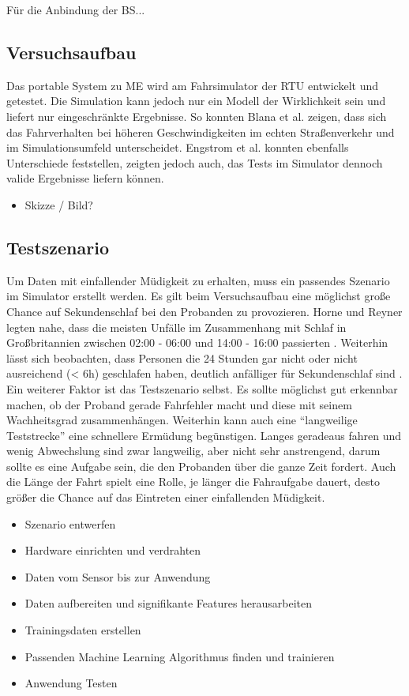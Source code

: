 {Für die Anbindung der \acl{BS}...


\subsection{Versuchsaufbau}
Das portable System zu \acl{ME} wird am Fahrsimulator der \acl{RTU} entwickelt und getestet.
Die Simulation kann jedoch nur ein Modell der Wirklichkeit sein und liefert nur eingeschränkte Ergebnisse. So konnten Blana et al. \cite{Blana_1} zeigen, dass sich das Fahrverhalten bei höheren Geschwindigkeiten im echten Straßenverkehr und im Simulationsumfeld unterscheidet. Engstrom et al.  \cite{Engstrom_2322937} konnten ebenfalls Unterschiede feststellen, zeigten jedoch auch, das Tests im Simulator dennoch valide Ergebnisse liefern können. 

\begin{itemize}
	\item Skizze / Bild?
\end{itemize}

\subsection{Testszenario}
Um Daten mit einfallender Müdigkeit zu erhalten, muss ein passendes Szenario im Simulator erstellt werden. Es gilt beim Versuchsaufbau eine möglichst große Chance auf Sekundenschlaf bei den Probanden zu provozieren. Horne und Reyner legten nahe, dass die meisten Unfälle im Zusammenhang mit Schlaf in Großbritannien zwischen 02:00 - 06:00 und 14:00 - 16:00 passierten \cite{Horne_1757738}. Weiterhin lässt sich beobachten, dass Personen die 24 Stunden gar nicht oder nicht ausreichend (< 6h) geschlafen haben, deutlich anfälliger für Sekundenschlaf sind \cite{Peters_1}. 
Ein weiterer Faktor ist das Testszenario selbst. Es sollte möglichst gut erkennbar machen, ob der Proband gerade Fahrfehler macht und diese mit seinem Wachheitsgrad zusammenhängen. Weiterhin kann auch eine "`langweilige Teststrecke"' eine schnellere Ermüdung begünstigen. Langes geradeaus fahren und wenig Abwechslung sind zwar langweilig, aber nicht sehr anstrengend, darum sollte es eine Aufgabe sein, die den Probanden über die ganze Zeit fordert. Auch die Länge der Fahrt spielt eine Rolle, je länger die Fahraufgabe dauert, desto größer die Chance auf das Eintreten einer einfallenden Müdigkeit.


\begin{itemize}
  \item Szenario entwerfen
  \item Hardware einrichten und verdrahten
  \item Daten vom Sensor bis zur Anwendung
  \item Daten aufbereiten und signifikante Features herausarbeiten
  \item Trainingsdaten erstellen
  \item Passenden Machine Learning Algorithmus finden und trainieren
  \item Anwendung Testen
\end{itemize}

}
